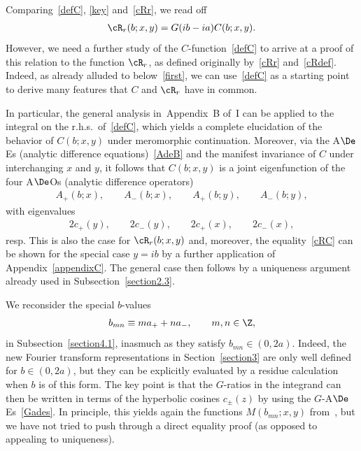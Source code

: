 \documentclass[pdftex]{sigma}
\numberwithin{equation}{section}
\begin{document}
Comparing~\eqref{defC}, \eqref{key} and~\eqref{cRr}, we read of\/f
\begin{gather}\label{cRC}
\cR_r(b;x,y)=G(ib-ia)C(b;x,y).
\end{gather}
However, we need a further study of the $C$-function~\eqref{defC} to arrive at a proof of this relation to the function $\cR_r$, as def\/ined originally by~\eqref{cRr} and~\eqref{cRdef}. Indeed, as already alluded to below~\eqref{first}, we can use~\eqref{defC} as a starting point to derive many features that $C$ and $\cR_r$ have in common.

In particular, the general analysis in~Appendix~B of~I can be applied to the integral on the r.h.s.\ of~\eqref{defC}, which yields a complete elucidation of the behavior of $C(b;x,y)$ under meromorphic continuation.
Moreover, via the A$\De$Es (analytic dif\/ference equations)~\eqref{AdeB} and the manifest invariance of $C$ under interchanging $x$ and $y$, it follows that
$C(b;x,y)$ is a joint eigenfunction of the four A$\De$Os (analytic dif\/ference operators)
\begin{gather}\label{4A}
A_{+}(b;x),\qquad A_{-}(b;x),\qquad A_{+}(b;y),\qquad
A_{-}(b;y),
\end{gather}
with eigenvalues
\begin{gather}\label{4ev}
2c_{+}(y),\qquad 2c_{-}(y),\qquad
2c_{+}(x),\qquad 2c_{-}(x),
\end{gather}
resp. This is also the case for $\cR_r(b;x,y)$ and, moreover, the equality~\eqref{cRC} can be shown for the special case $y=ib$ by a further application of Appendix~\ref{appendixC}. The general case then follows by a uniqueness argument already used in Subsection~\ref{section2.3}.

We reconsider the special $b$-values
\begin{gather}\label{bmn}
b_{mn}\equiv ma_{+}+na_{-},\qquad m,n\in\Z,
\end{gather}
in Subsection~\ref{section4.1}, inasmuch as they satisfy $b_{mn}\in(0,2a)$.  Indeed, the new Fourier transform representations in Section~\ref{section3} are only well def\/ined for $b\in(0,2a)$, but they can be explicitly evaluated by a residue calculation when $b$ is of this form. The key point is that the $G$-ratios in the integrand can then be written in terms of the hyperbolic cosines $c_{\pm}(z)$ by using the $G$-A$\De$Es~\eqref{Gades}. In principle, this yields again the functions $M(b_{mn};x,y)$ from~\cite{GLFII}, but we have not tried to push through a direct equality proof (as opposed to appealing to uniqueness).
\end{document}
